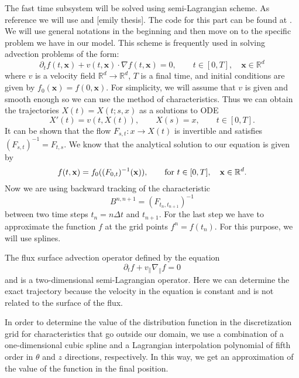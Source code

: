 The fast time subsystem will be solved using semi-Lagrangian scheme. As reference we will use \cite{campospinto} and [emily thesis]. %
The code for this part can be found at \cite{pygyro_code}. We will use general notations in the beginning and then move on to the specific problem we have in our model. This scheme is frequently used in solving advection problems of the form:
\begin{equation}
    \partial_t f(t,\mathbf{x})+v(t,\mathbf{x})\cdot \nabla f(t,\mathbf{x})=0, \qquad t\in[0,T], \quad \mathbf{x}\in\mathbb{R}^d
\end{equation}
where $v$ is a velocity field $\mathbb{R}^d\longrightarrow\mathbb{R}^d$, $T$ is a final time, and initial conditions are given by $f_0(\mathbf{x})=f(0,\mathbf{x})$. For simplicity, we will assume that $v$ is given and smooth enough so we can use the method of characteristics. Thus we can obtain the trajectories $X(t)=X(t;s,x)$ as a solutions to ODE
\begin{equation}
    X'(t)=v(t,X(t)), \qquad X(s)=x, \qquad t\in[0,T].
\end{equation}
It can be shown that the flow $F_{s,t}:x\longrightarrow X(t)$ is invertible and satisfies $(F_{s,t})^{-1}=F_{t,s}$. We know that the analytical solution to our equation is given by
\begin{equation}
    f(t,\mathbf{x})=f_0((F_{0,t})^{-1}(\mathbf{x})),\qquad \text{for } t\in[0,T], \quad \mathbf{x}\in\mathbb{R}^d.
\end{equation}
Now we are using backward tracking of the characteristic
\begin{equation}
    B^{n,n+1}=(F_{t_n,t_{n+1}})^{-1}
\end{equation}
between two time steps $t_n=n\Delta t$ and $t_{n+1}$. For the last step we have to approximate the function $f$ at the grid points $f^n=f(t_n)$. For this purpose, we will use splines.

The flux surface advection operator defined by the equation
\begin{equation}
 \partial_t f + v_\parallel \nabla_\parallel f = 0
\end{equation}
and is a two-dimensional semi-Lagrangian operator. Here we can determine the exact trajectory because the velocity in the equation is constant and is not related to the surface of the flux.

In order to determine the value of the distribution function in the discretization grid for characteristics that go outside our domain, we use a combination of a one-dimensional cubic spline and a Lagrangian interpolation polynomial of fifth order in $\theta$ and $z$ directions, respectively. In this way, we get an approximation of the value of the function in the final position.

